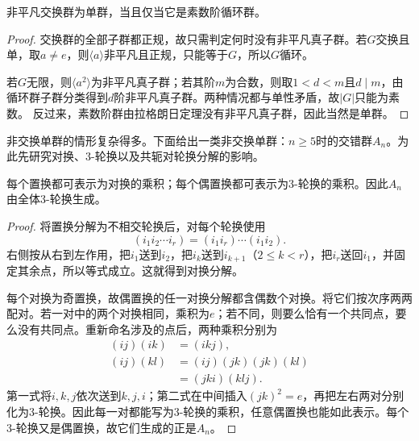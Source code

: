 \begin{proposition}
非平凡交换群为单群，当且仅当它是素数阶循环群。
\end{proposition}
\begin{proof}
交换群的全部子群都正规，故只需判定何时没有非平凡真子群。若$G$交换且单，取$a\ne e$，则$\langle a\rangle$非平凡且正规，只能等于$G$，所以$G$循环。

若$G$无限，则$\langle a^2\rangle$为非平凡真子群；若其阶$m$为合数，则取$1<d<m$且$d\mid m$，由循环群子群分类得到$d$阶非平凡真子群。两种情况都与单性矛盾，故$|G|$只能为素数。
反过来，素数阶群由拉格朗日定理没有非平凡真子群，因此当然是单群。
\end{proof}

非交换单群的情形复杂得多。下面给出一类非交换单群：$n\geq5$时的交错群$A_n$。为此先研究对换、3-轮换以及共轭对轮换分解的影响。

\begin{lemma}\label{p2:three-cycles}
每个置换都可表示为对换的乘积；每个偶置换都可表示为3-轮换的乘积。因此$A_n$由全体3-轮换生成。
\end{lemma}
\begin{proof}
将置换分解为不相交轮换后，对每个轮换使用
\[
(i_1i_2\cdots i_r)=(i_1i_r)\cdots(i_1i_2).
\]
右侧按从右到左作用，把$i_1$送到$i_2$，把$i_k$送到$i_{k+1}$（$2\leq k<r$），把$i_r$送回$i_1$，并固定其余点，所以等式成立。这就得到对换分解。

每个对换为奇置换，故偶置换的任一对换分解都含偶数个对换。将它们按次序两两配对。若一对中的两个对换相同，乘积为$e$；若不同，则要么恰有一个共同点，要么没有共同点。重新命名涉及的点后，两种乘积分别为
\begin{align*}
(ij)(ik)&=(ikj),\\
(ij)(kl)&=(ij)(jk)(jk)(kl)\\
&=(jki)(klj).
\end{align*}
第一式将$i,k,j$依次送到$k,j,i$；第二式在中间插入$(jk)^2=e$，再把左右两对分别化为3-轮换。因此每一对都能写为3-轮换的乘积，任意偶置换也能如此表示。每个3-轮换又是偶置换，故它们生成的正是$A_n$。
\end{proof}

